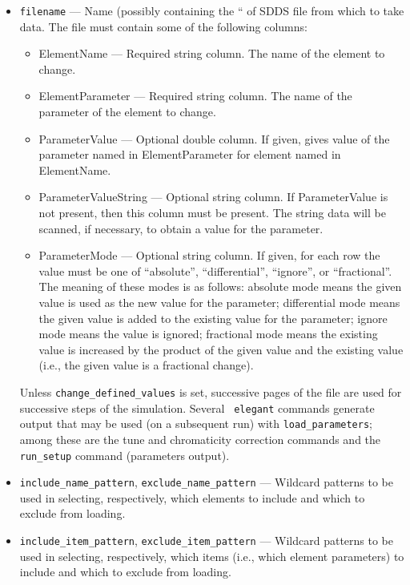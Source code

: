 \documentclass[11pt]{article}
\begin{document}
\begin{itemize}
\item \verb|filename| --- Name (possibly containing the ``%
of SDDS file from which to take data.  The file
must contain some of the following columns:
\begin{itemize}
\item ElementName --- Required string column.  The name of the element to change.
\item ElementParameter --- Required string column.  The name of the parameter of the element to change.
\item ParameterValue --- Optional double column.  If given, gives value of the parameter named
 in ElementParameter for element named in ElementName.
\item ParameterValueString --- Optional string column.  If ParameterValue is not present, then
this column must be present.  The string data will be scanned, if necessary,
to obtain a value for the parameter.
\item ParameterMode --- Optional string column.  If given, for each row the value must be
one of ``absolute'', ``differential'', ``ignore'', or ``fractional''.  The meaning of these
modes is as follows: absolute mode means the given value is used as the new value for
the parameter; differential mode means the given value is added to the existing value
for the parameter; ignore mode means the value is ignored; fractional mode means the
existing value is increased by the product of the given value and the existing value 
(i.e., the given value is a fractional change).
\end{itemize}

Unless \verb|change_defined_values| is set, successive pages of the
file are used for successive steps of the simulation.  Several {\tt
elegant} commands generate output that may be used (on a subsequent
run) with \verb|load_parameters|; among these are the tune and
chromaticity correction commands and the \verb|run_setup| command
(parameters output).

\item \verb|include_name_pattern|, \verb|exclude_name_pattern| ---
Wildcard patterns to be used in selecting, respectively, which
elements to include and which to exclude from loading.

\item \verb|include_item_pattern|, \verb|exclude_item_pattern| ---
Wildcard patterns to be used in selecting, respectively, which items
(i.e., which element parameters) to include and which to exclude from
loading.


\end{itemize}
\end{document}
